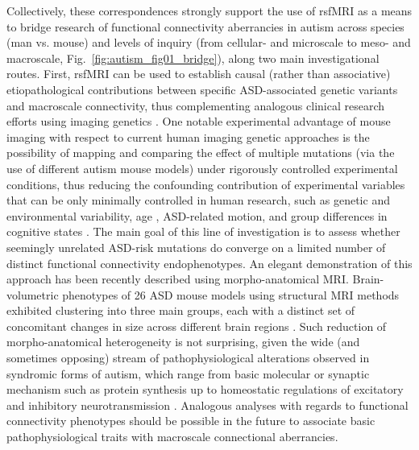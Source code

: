Collectively, these correspondences strongly support the use of rsfMRI as a
means to bridge research of functional connectivity aberrancies in autism across
species (man vs. mouse) and levels of inquiry (from cellular- and microscale to
meso- and macroscale, Fig.~\ref{fig:autism_fig01_bridge}), along two main
investigational routes. First, rsfMRI can be used to establish causal (rather
than associative) etiopathological contributions between specific ASD-associated
genetic variants and macroscale connectivity, thus complementing analogous
clinical research efforts using imaging genetics \parencite{rudie2012,
scott-vanzeeland2010}. One notable experimental advantage of mouse imaging with
respect to current human imaging genetic approaches is the possibility of
mapping and comparing the effect of multiple mutations (via the use of different
autism mouse models) under rigorously controlled experimental conditions, thus
reducing the confounding contribution of experimental variables that can be only
minimally controlled in human research, such as genetic and environmental
variability, age \parencite{uddin2013}, ASD-related motion, and group
differences in cognitive states \parencite{vasa2016}. The main goal of this line
of investigation is to assess whether seemingly unrelated ASD-risk mutations do
converge on a limited number of distinct functional connectivity endophenotypes.
An elegant demonstration of this approach has been recently described using
morpho-anatomical MRI. Brain-volumetric phenotypes of 26 ASD mouse models using
structural MRI methods exhibited clustering into three main groups, each with a
distinct set of concomitant changes in size across different brain regions
\parencite{ellegood2015a}. Such reduction of morpho-anatomical heterogeneity is
not surprising, given the wide (and sometimes opposing) stream of
pathophysiological alterations observed in syndromic forms of autism, which
range from basic molecular or synaptic mechanism such as protein synthesis
\parencite{geschwind2007, auerbach2011} up to homeostatic regulations of
excitatory and inhibitory neurotransmission \parencite{nelson2015}. Analogous
analyses with regards to functional connectivity phenotypes should be possible
in the future to associate basic pathophysiological traits with macroscale
connectional aberrancies. 

